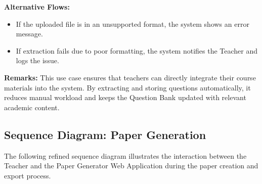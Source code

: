 \documentclass[12pt]{article}
\begin{document}
	\textbf{Alternative Flows:}
	\begin{itemize}
		\item If the uploaded file is in an unsupported format, the system shows an error message.
		\item If extraction fails due to poor formatting, the system notifies the Teacher and logs the issue.
	\end{itemize}
	
	\textbf{Remarks:}  
	This use case ensures that teachers can directly integrate their course materials into the system. By extracting and storing questions automatically, it reduces manual workload and keeps the Question Bank updated with relevant academic content.
	
	
	\newpage
\subsection{Sequence Diagram: Paper Generation}

The following refined sequence diagram illustrates the interaction between
the Teacher and the Paper Generator Web Application during the paper creation
and export process.
\end{document}

